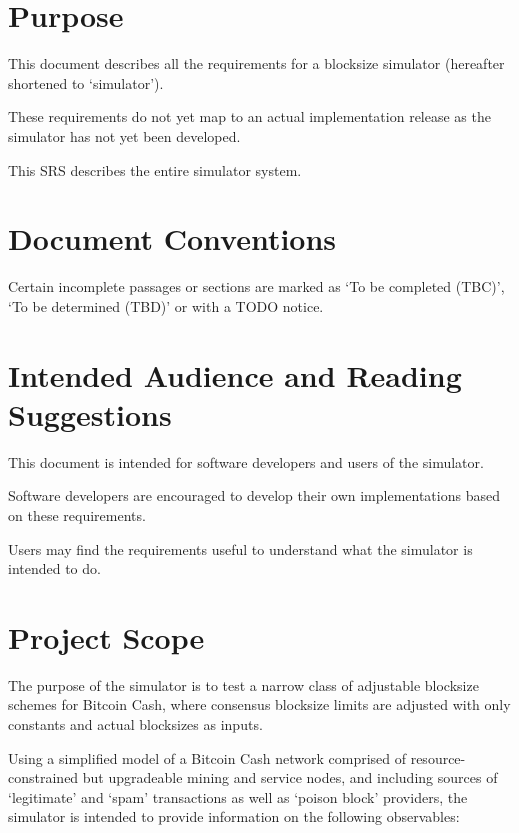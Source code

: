 \documentclass{scrreprt}
\begin{document}
  \section{Purpose}

    This document describes all the requirements for a blocksize simulator
    (hereafter shortened to `simulator').

    These requirements do not yet map to an actual implementation release
    as the simulator has not yet been developed.

    This SRS describes the entire simulator system.

  \section{Document Conventions}

    Certain incomplete passages or sections are marked as `To be completed
    (TBC)', `To be determined (TBD)' or with a TODO notice.

  \section{Intended Audience and Reading Suggestions}

    This document is intended for software developers and users of the
    simulator.

    Software developers are encouraged to develop their own implementations
    based on these requirements.

    Users may find the requirements useful to understand what the simulator is
    intended to do.

  \section{Project Scope}

    The purpose of the simulator is to test a narrow class of adjustable
    blocksize schemes for Bitcoin Cash, where consensus blocksize limits are
    adjusted with only constants and actual blocksizes as inputs.

    Using a simplified model of a Bitcoin Cash network comprised of
    resource-constrained but upgradeable mining and service nodes, and
    including sources of `legitimate' and `spam' transactions as well as
    `poison block' providers, the simulator is intended to provide information
    on the following observables:
\end{document}
